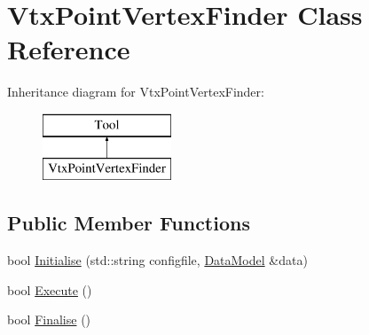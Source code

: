 \hypertarget{classVtxPointVertexFinder}{\section{Vtx\-Point\-Vertex\-Finder Class Reference}
\label{classVtxPointVertexFinder}
}
Inheritance diagram for Vtx\-Point\-Vertex\-Finder\-:\begin{figure}[H]
\begin{center}
\leavevmode
\includegraphics[height=2.000000cm]{classVtxPointVertexFinder}
\end{center}
\end{figure}
\subsection*{Public Member Functions}
\begin{DoxyCompactItemize}
\item 
bool \hyperlink{classVtxPointVertexFinder_a5f022abdc58cbce7e071e596bcb1d75d}{Initialise} (std\-::string configfile, \hyperlink{classDataModel}{Data\-Model} \&data)
\item 
bool \hyperlink{classVtxPointVertexFinder_ad834ee2a0ce8fb24c3a7ebdbac796072}{Execute} ()
\item 
bool \hyperlink{classVtxPointVertexFinder_aa8161e8fd414eab8bf17766cb353aa91}{Finalise} ()
\end{DoxyCompactItemize}


